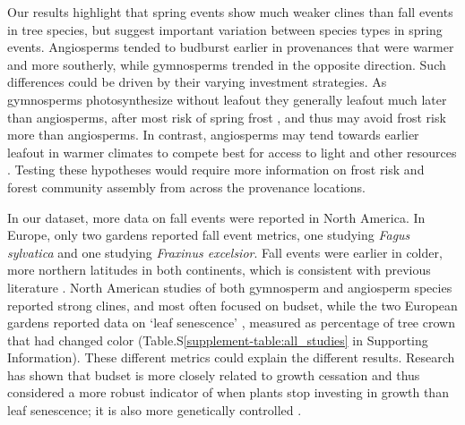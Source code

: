 \documentclass{article}
\begin{document}
Our results highlight that spring events show much weaker clines than fall events in tree species, but suggest important variation between species types in spring events. Angiosperms tended to budburst earlier in provenances that were warmer and more southerly, while gymnosperms trended in the opposite direction. Such differences could be driven by their varying investment strategies. As gymnosperms photosynthesize without leafout they generally leafout much later than angiosperms, after most risk of spring frost \citep{panchen14}, and thus may avoid frost risk more than angiosperms. In contrast, angiosperms may tend towards earlier leafout in warmer climates to compete best for access to light and other resources \citep{cat2019}. Testing these hypotheses would require more information on frost risk and forest community assembly from across the provenance locations. 

In our dataset, more data on fall events were reported in North America. In Europe, only two gardens reported fall event metrics, one studying \emph{Fagus sylvatica} and one studying \emph{Fraxinus excelsior}. Fall events were earlier in colder, more northern latitudes in both continents, which is consistent with previous literature \citep{AitkenBemmels16, Alberto13}. North American studies of both gymnosperm and angiosperm species reported strong clines, and most often focused on budset, while the two European gardens reported data on `leaf senescence' \citep{rosique22}, measured as percentage of tree crown that had changed color (Table.S\ref{supplement-table:all_studies} in Supporting Information). These different metrics could explain the different results. Research has shown that budset is more closely related to growth cessation and thus considered a more robust indicator of when plants stop investing in growth than leaf senescence; it is also more genetically controlled \citep[with different photoperiod thresholds required to trigger budset in different provenances,][]{Alberto13}. 
\end{document}
